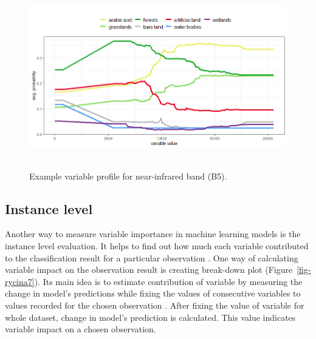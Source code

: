 \documentclass{amuthesis}
\begin{document}
\begin{figure}[H]

{\centering \includegraphics[width=5.625in,height=3.125in]{./figures/profB5.png}

}

\caption{\label{fig-rycina6}Example variable profile for near-infrared
band (B5).}

\end{figure}

\hypertarget{sec-importance-instance}{%
\subsection{Instance level}\label{sec-importance-instance}}

Another way to measure variable importance in machine learning models is
the instance level evaluation. It helps to find out how much each
variable contributed to the classification result for a particular
observation \autocite{biecek_explanatory_2021}. One way of calculating
variable impact on the observation result is creating break-down plot
(Figure~\ref{fig-rycina7}). Its main idea is to estimate contribution of
variable by measuring the change in model's predictions while fixing the
values of consecutive variables to values recorded for the chosen
observation \autocite{biecek_explanatory_2021}. After fixing the value
of variable for whole dataset, change in model's prediction is
calculated. This value indicates variable impact on a chosen
observation.
\end{document}
